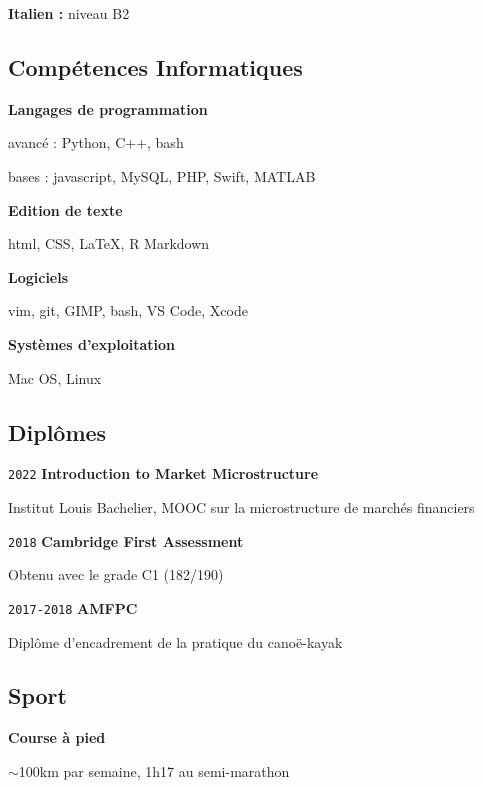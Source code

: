 \documentclass{article}
\begin{document}
\begin{multicols}{2}
\begin{itemize}
			\textbf{Italien :} niveau B2
		\end{itemize}

	{\color{blue} \subsection*{Compétences Informatiques}}

		\noindent\textbf{Langages de programmation}

		avancé : Python, C++, bash
				
		bases : javascript, MySQL, PHP, Swift, MATLAB

\hfill

		\noindent\textbf{Edition de texte}

		html, CSS, \LaTeX, R Markdown

\hfill

		\noindent\textbf{Logiciels}

		vim, git, GIMP, bash, VS Code, Xcode

\hfill

		\noindent\textbf{Systèmes d'exploitation}

		Mac OS, Linux

\hfill

{\color{blue} \subsection*{Diplômes}}

		\noindent\texttt{2022} \textbf{Introduction to Market Microstructure}

		Institut Louis Bachelier, MOOC sur la microstructure de marchés financiers

\hfill

		\noindent\texttt{2018} \textbf{Cambridge First Assessment}

		Obtenu avec le grade C1 (182/190)

\hfill

		\noindent\texttt{2017-2018} \textbf{AMFPC}

		Diplôme d'encadrement de la pratique du canoë-kayak

\hfill

{\color{blue} \subsection*{Sport}\label{sport}}

		\noindent\textbf{Course à pied}

		$\sim$100km par semaine, 1h17 au semi-marathon


\end{multicols}
\end{document}
